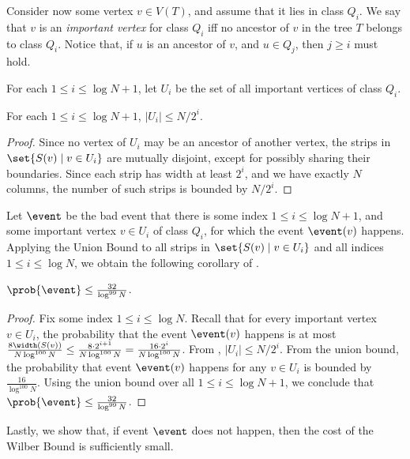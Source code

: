 Consider now some vertex $v\in V(T)$, and assume that it lies in class $Q_i$. We say that $v$ is an \emph{important vertex} for class $Q_i$ iff no ancestor of $v$ in the tree $T$ belongs to class $Q_i$. Notice that, if $u$ is an ancestor of $v$, and $u\in Q_j$, then $j\geq i$ must hold.

For each $1\leq i\leq \log N+1$, let $U_i$ be the set of all important vertices of class $Q_i$. 

\begin{myobs}
\label{obs: bounded U_i} 
For each $1\leq i\leq \log N+1$, $|U_i| \leq N/2^i$. 
\end{myobs}
\begin{proof}
Since no vertex of $U_i$ may be an ancestor of another vertex, the strips in $\set{S(v)\mid v\in U_i}$ are mutually disjoint, except for possibly sharing their boundaries. 
Since each strip has width at least $2^i$, and we have exactly $N$ columns, the number of such strips is bounded by $N/2^i$. 
\end{proof}  



Let $\event$ be the bad event that there is some index $1\leq i\leq \log N+1$, and some important vertex $v\in U_i$ of class $Q_i$, for which  the event $\event(v)$ happens. 
Applying the Union Bound to all strips in $\set{S(v)\mid v\in U_i}$ and  all indices $1\leq i\leq \log N$, we obtain the following corollary of .



\begin{corollary}\label{cor: no bad important strips}
	 $\prob{\event}\leq \frac{32}{\log^{99}N}$.
\end{corollary}
\begin{proof}
	Fix some index $1\leq i\leq \log N$. Recall that for every important vertex $v\in U_i$, the probability that the event $\event(v)$ happens is at most $\frac{8\width(S(v))}{N\log^{100} N}\leq \frac{8\cdot 2^{i+1}}{N\log^{100}N}=\frac{16\cdot 2^{i}}{N\log^{100}N}$. 
From , $|U_i|\leq N/2^i$. 
From the union bound, the probability that event $\event(v)$ happens for any $v\in U_i$ is bounded by $\frac{16}{\log^{100}N}$. 
Using the union bound over all  $1\leq i\leq \log N+1$, we conclude that  $\prob{\event}\leq \frac{32}{\log^{99}N}$.
\end{proof}



Lastly, we show that, if event $\event$ does not happen, then the cost of the Wilber Bound is sufficiently small.
	
